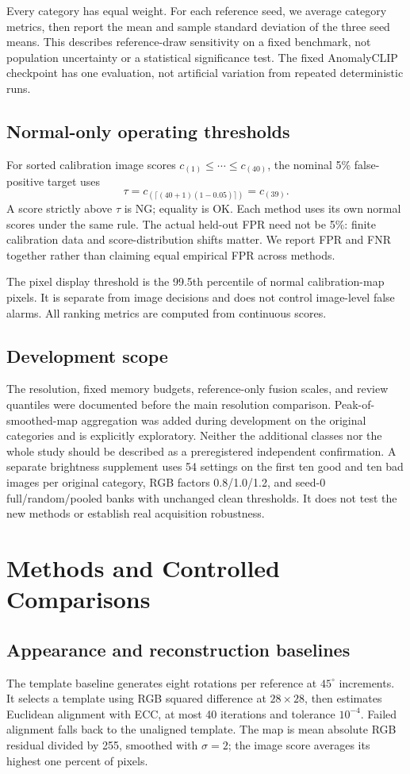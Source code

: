 \documentclass[10pt,twocolumn,letterpaper]{article}
\begin{document}
Every category has equal weight. For each reference seed, we average category metrics, then report the mean and sample standard deviation of the three seed means. This describes reference-draw sensitivity on a fixed benchmark, not population uncertainty or a statistical significance test. The fixed AnomalyCLIP checkpoint has one evaluation, not artificial variation from repeated deterministic runs.
\subsection{Normal-only operating thresholds}
For sorted calibration image scores $c_{(1)}\leq\cdots\leq c_{(40)}$, the nominal 5\% false-positive target uses
\begin{equation}
\tau=c_{(\lceil(40+1)(1-0.05)\rceil)}=c_{(39)}.
\end{equation}
A score strictly above $\tau$ is NG; equality is OK. Each method uses its own normal scores under the same rule. The actual held-out FPR need not be 5\%: finite calibration data and score-distribution shifts matter. We report FPR and FNR together rather than claiming equal empirical FPR across methods.

The pixel display threshold is the 99.5th percentile of normal calibration-map pixels. It is separate from image decisions and does not control image-level false alarms. All ranking metrics are computed from continuous scores.
\subsection{Development scope}
The resolution, fixed memory budgets, reference-only fusion scales, and review quantiles were documented before the main resolution comparison. Peak-of-smoothed-map aggregation was added during development on the original categories and is explicitly exploratory. Neither the additional classes nor the whole study should be described as a preregistered independent confirmation. A separate brightness supplement uses 54 settings on the first ten good and ten bad images per original category, RGB factors 0.8/1.0/1.2, and seed-0 full/random/pooled banks with unchanged clean thresholds. It does not test the new methods or establish real acquisition robustness.
\clearpage
\section{Methods and Controlled Comparisons}
\subsection{Appearance and reconstruction baselines}
The template baseline generates eight rotations per reference at $45^\circ$ increments. It selects a template using RGB squared difference at $28\times28$, then estimates Euclidean alignment with ECC, at most 40 iterations and tolerance $10^{-4}$. Failed alignment falls back to the unaligned template. The map is mean absolute RGB residual divided by 255, smoothed with $\sigma=2$; the image score averages its highest one percent of pixels.
\end{document}
